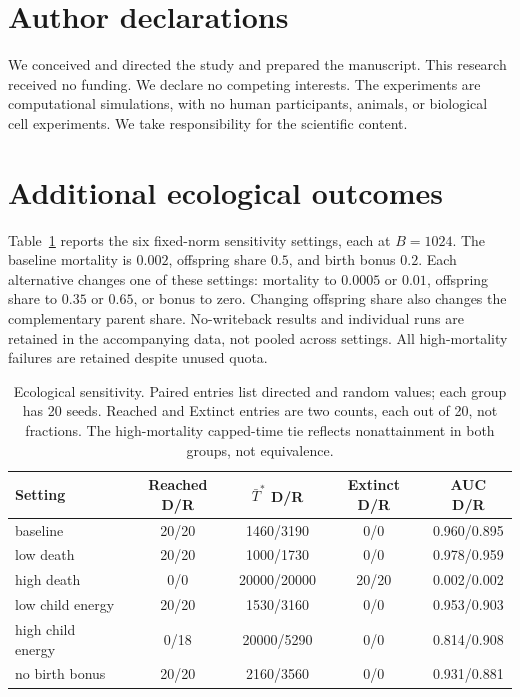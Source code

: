 \documentclass[11pt]{article}
\begin{document}
\section*{Author declarations}
We conceived and directed the study and prepared the manuscript. This research received no funding. We declare no competing interests. The experiments are computational simulations, with no human participants, animals, or biological cell experiments. We take responsibility for the scientific content.

\appendix
\section{Additional ecological outcomes}\label{app:robust}
Table~\ref{tab:robust} reports the six fixed-norm sensitivity settings, each at $B=1024$. The baseline mortality is $0.002$, offspring share $0.5$, and birth bonus $0.2$. Each alternative changes one of these settings: mortality to $0.0005$ or $0.01$, offspring share to $0.35$ or $0.65$, or bonus to zero. Changing offspring share also changes the complementary parent share. No-writeback results and individual runs are retained in the accompanying data, not pooled across settings. All high-mortality failures are retained despite unused quota.
\begin{table}[htbp]\caption{Ecological sensitivity. Paired entries list directed and random values; each group has 20 seeds. Reached and Extinct entries are two counts, each out of 20, not fractions. The high-mortality capped-time tie reflects nonattainment in both groups, not equivalence.}\label{tab:robust}
\begin{center}
\small
\begin{tabular}{lcccc}
\toprule
Setting & Reached D/R & $\bar T^*$ D/R & Extinct D/R & AUC D/R \\
\midrule
baseline & 20/20 & 1460/3190 & 0/0 & 0.960/0.895 \\
low death & 20/20 & 1000/1730 & 0/0 & 0.978/0.959 \\
high death & 0/0 & 20000/20000 & 20/20 & 0.002/0.002 \\
low child energy & 20/20 & 1530/3160 & 0/0 & 0.953/0.903 \\
high child energy & 0/18 & 20000/5290 & 0/0 & 0.814/0.908 \\
no birth bonus & 20/20 & 2160/3560 & 0/0 & 0.931/0.881 \\
\bottomrule
\end{tabular}
\end{center}
\end{table}
\end{document}
